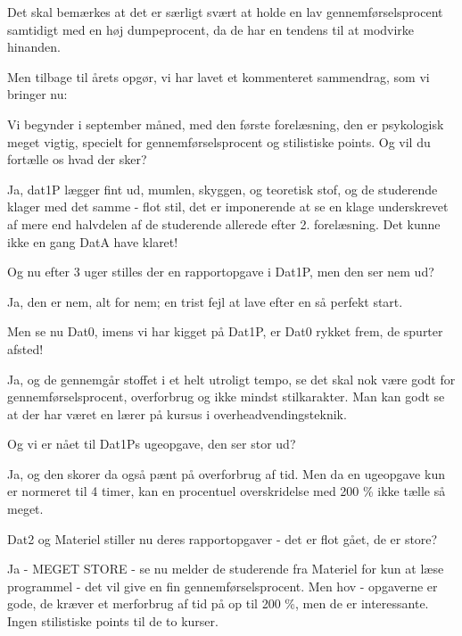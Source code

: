 \documentclass[a4paper,11pt]{article}
\begin{document}
\begin{sketch}
            Det skal bemærkes at det er særligt svært at holde en lav gennemførselsprocent samtidigt med en høj dumpeprocent, da de har en
            tendens til at modvirke hinanden.

     Men tilbage til årets opgør, vi har lavet et kommenteret sammendrag, som vi bringer nu:


     Vi begynder i september måned, med den første forelæsning, den er psykologisk meget vigtig, specielt for gennemførselsprocent
             og stilistiske points. Og vil du fortælle os hvad der sker?

     Ja, dat1P lægger fint ud, mumlen, skyggen, og teoretisk stof, og de studerende klager med det samme - flot stil, det er
             imponerende at se en klage underskrevet af mere end halvdelen af de studerende allerede efter 2. forelæsning.
             Det kunne ikke en gang DatA have klaret!

     Og nu efter 3 uger stilles der en rapportopgave i Dat1P, men den ser nem ud?

     Ja, den er nem, alt for nem; en trist fejl at lave efter en så perfekt start.

     Men se nu Dat0, imens vi har kigget på Dat1P, er Dat0 rykket frem, de spurter afsted!

     Ja, og de gennemgår stoffet i et helt utroligt tempo, se det skal nok være godt for gennemførselsprocent,
             overforbrug og ikke mindst stilkarakter. Man kan godt se at der har været en lærer på kursus i overheadvendingsteknik.

     Og vi er nået til Dat1Ps ugeopgave, den ser stor ud?
    
     Ja, og den skorer da også pænt på overforbrug af tid. Men da en ugeopgave kun er normeret til 4 timer,
             kan en procentuel overskridelse med 200 \% ikke tælle så meget.

     Dat2 og Materiel stiller nu deres rapportopgaver - det er flot gået, de er store?

     Ja - MEGET STORE - se nu melder de studerende fra Materiel for kun at læse programmel -
             det vil give en fin gennemførselsprocent. Men hov - opgaverne er gode, de kræver et merforbrug af tid på op til 200 \%,
             men de er interessante. Ingen stilistiske points til de to kurser.


\end{sketch}
\end{document}
